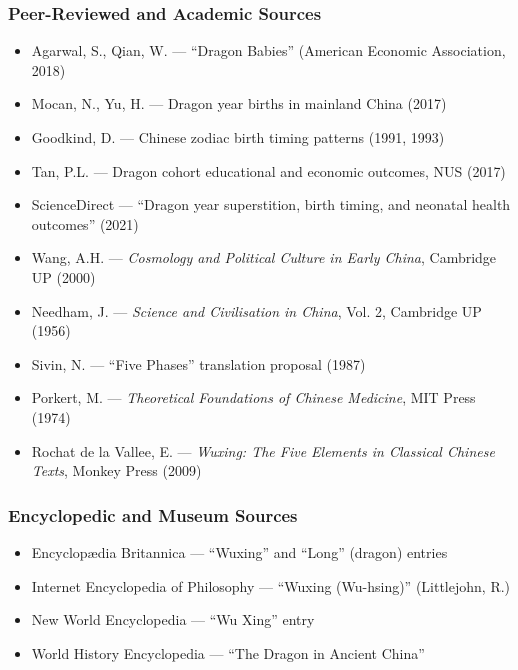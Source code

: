 \documentclass[11pt,letterpaper]{article}
\newcommand{\stageheader}[2]{%
  \noindent\colorbox{#2}{\makebox[\textwidth][l]{%
    \textcolor{white}{\bfseries\sffamily\hspace{6pt}#1\hspace{6pt}}}}%
  \vspace{0.5em}\par%
}
\begin{document}
\subsubsection{Peer-Reviewed and Academic Sources}
\begin{itemize}[leftmargin=2em]
\item Agarwal, S., Qian, W. --- ``Dragon Babies'' (American Economic Association, 2018)
\item Mocan, N., Yu, H. --- Dragon year births in mainland China (2017)
\item Goodkind, D. --- Chinese zodiac birth timing patterns (1991, 1993)
\item Tan, P.L. --- Dragon cohort educational and economic outcomes, NUS (2017)
\item ScienceDirect --- ``Dragon year superstition, birth timing, and neonatal health outcomes'' (2021)
\item Wang, A.H. --- \emph{Cosmology and Political Culture in Early China}, Cambridge UP (2000)
\item Needham, J. --- \emph{Science and Civilisation in China}, Vol. 2, Cambridge UP (1956)
\item Sivin, N. --- ``Five Phases'' translation proposal (1987)
\item Porkert, M. --- \emph{Theoretical Foundations of Chinese Medicine}, MIT Press (1974)
\item Rochat de la Vallee, E. --- \emph{Wuxing: The Five Elements in Classical Chinese Texts}, Monkey Press (2009)
\end{itemize}

\subsubsection{Encyclopedic and Museum Sources}
\begin{itemize}[leftmargin=2em]
\item Encyclopædia Britannica --- ``Wuxing'' and ``Long'' (dragon) entries
\item Internet Encyclopedia of Philosophy --- ``Wuxing (Wu-hsing)'' (Littlejohn, R.)
\item New World Encyclopedia --- ``Wu Xing'' entry
\item World History Encyclopedia --- ``The Dragon in Ancient China''
\end{itemize}

\newpage
\stageheader{STAGE 3 --- MISSION PACKAGE}{tertiary}
\end{document}
